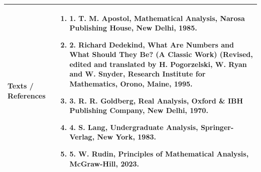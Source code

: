 \documentclass[11pt,a4paper]{article}
\begin{document}
\begin{tabularx}{\textwidth}{|p{3.2cm}|X|}
\hline
\textbf{Texts / References} & \begin{enumerate}[leftmargin=*,noitemsep,topsep=2pt]  \item 1. T. M. Apostol, Mathematical Analysis, Narosa Publishing House, New Delhi, 1985.  \item 2. Richard Dedekind, What Are Numbers and What Should They Be? (A Classic Work)  (Revised, edited and translated by H. Pogorzelski, W. Ryan and W. Snyder, Research Institute  for Mathematics, Orono, Maine, 1995.  \item 3. R. R. Goldberg, Real Analysis, Oxford \& IBH Publishing Company, New Delhi, 1970.  \item 4. S. Lang, Undergraduate Analysis, Springer-Verlag, New York, 1983.  \item 5. W. Rudin, Principles of Mathematical Analysis, McGraw-Hill, 2023.\end{enumerate} \\
\hline
\end{tabularx}
\clearpage
\end{document}
